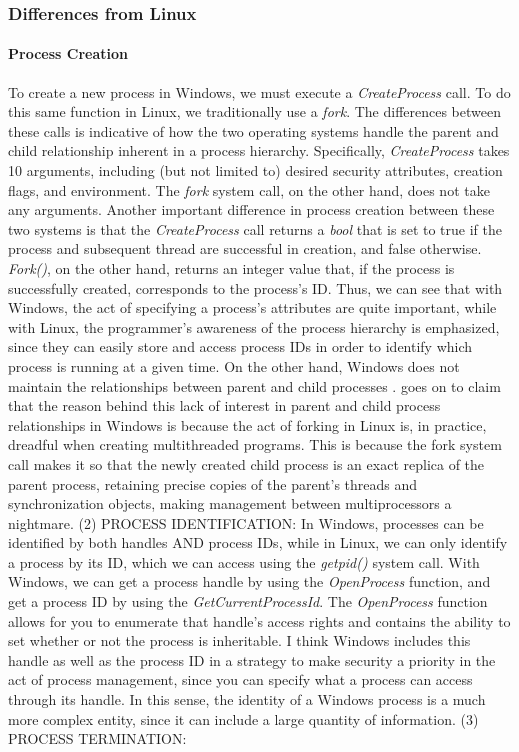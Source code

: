 \documentclass[letterpaper,10pt,titlepage]{article}
\begin{document}
\subsubsection{Differences from Linux}
\paragraph{Process Creation} To create a new process in Windows, we must execute a \emph{CreateProcess} call. To do this same function in Linux, we traditionally use a \emph{fork}. The differences between these calls is indicative of how the two operating systems handle the parent and child relationship inherent in a process hierarchy. Specifically, \emph{CreateProcess} takes 10 arguments, including (but not limited to) desired security attributes, creation flags, and environment. The \emph{fork} system call, on the other hand, does not take any arguments. Another important difference in process creation between these two systems is that the \emph{CreateProcess} call returns a \emph{bool} that is set to true if the process and subsequent thread are successful in creation, and false otherwise. \emph{Fork()}, on the other hand, returns an integer value that, if the process is successfully created, corresponds to the process's ID. Thus, we can see that with Windows, the act of specifying a process's attributes are quite important, while with Linux, the programmer's awareness of the process hierarchy is emphasized, since they can easily store and access process IDs in order to identify which process is running at a given time. On the other hand, Windows does not maintain the relationships between parent and child processes \cite{har04}. \cite{har04} goes on to claim that the reason behind this lack of interest in parent and child process relationships in Windows is because the act of forking in Linux is, in practice, dreadful when creating multithreaded programs. This is because the fork system call makes it so that the newly created child process is an exact replica of the parent process, retaining precise copies of the parent's threads and synchronization objects, making management between multiprocessors a nightmare. 
(2) PROCESS IDENTIFICATION: In Windows, processes can be identified by both handles AND process IDs, while in Linux, we can only identify a process by its ID, which we can access using the \emph{getpid()} system call. With Windows, we can get a process handle by using the \emph{OpenProcess} function, and get a process ID by using the \emph{GetCurrentProcessId}. The \emph{OpenProcess} function allows for you to enumerate that handle's access rights and contains the ability to set whether or not the process is inheritable. I think Windows includes this handle as well as the process ID in a strategy to make security a priority in the act of process management, since you can specify what a process can access through its handle. In this sense, the identity of a Windows process is a much more complex entity, since it can include a large quantity of information.
(3) PROCESS TERMINATION:
\end{document}
